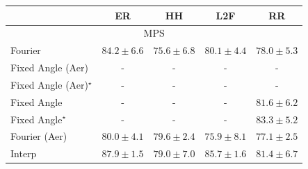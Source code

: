 \begin{tabular}{l|cccc|}
\toprule
            & ER & HH & L2F & RR \\
\midrule
\multicolumn{5}{c}{\rule{0pt}{8pt}MPS} \\
\midrule
Fourier & {\cellcolor[HTML]{DC5E0B}} \color[HTML]{F1F1F1} $84.2\pm 6.6$ & {\cellcolor[HTML]{FED16B}} \color[HTML]{000000} $75.6\pm 6.8$ & {\cellcolor[HTML]{FC9427}} \color[HTML]{000000} $80.1\pm 4.4$ & {\cellcolor[HTML]{FEB340}} \color[HTML]{000000} $78.0\pm 5.3$ \\
Fixed Angle (Aer) & {\cellcolor[HTML]{000000}} \color[HTML]{F1F1F1} {\cellcolor{white}} \color{black} - & {\cellcolor[HTML]{000000}} \color[HTML]{F1F1F1} {\cellcolor{white}} \color{black} - & {\cellcolor[HTML]{000000}} \color[HTML]{F1F1F1} {\cellcolor{white}} \color{black} - & {\cellcolor[HTML]{000000}} \color[HTML]{F1F1F1} {\cellcolor{white}} \color{black} - \\
Fixed Angle (Aer)$^\star$ & {\cellcolor[HTML]{000000}} \color[HTML]{F1F1F1} {\cellcolor{white}} \color{black} - & {\cellcolor[HTML]{000000}} \color[HTML]{F1F1F1} {\cellcolor{white}} \color{black} - & {\cellcolor[HTML]{000000}} \color[HTML]{F1F1F1} {\cellcolor{white}} \color{black} - & {\cellcolor[HTML]{000000}} \color[HTML]{F1F1F1} {\cellcolor{white}} \color{black} - \\
Fixed Angle & {\cellcolor[HTML]{000000}} \color[HTML]{F1F1F1} {\cellcolor{white}} \color{black} - & {\cellcolor[HTML]{000000}} \color[HTML]{F1F1F1} {\cellcolor{white}} \color{black} - & {\cellcolor[HTML]{000000}} \color[HTML]{F1F1F1} {\cellcolor{white}} \color{black} - & {\cellcolor[HTML]{F3801C}} \color[HTML]{F1F1F1} $81.6\pm 6.2$ \\
Fixed Angle$^\star$ & {\cellcolor[HTML]{000000}} \color[HTML]{F1F1F1} {\cellcolor{white}} \color{black} - & {\cellcolor[HTML]{000000}} \color[HTML]{F1F1F1} {\cellcolor{white}} \color{black} - & {\cellcolor[HTML]{000000}} \color[HTML]{F1F1F1} {\cellcolor{white}} \color{black} - & {\cellcolor[HTML]{E66A11}} \color[HTML]{F1F1F1} $83.3\pm 5.2$ \\
Fourier (Aer) & {\cellcolor[HTML]{FD9627}} \color[HTML]{000000} $80.0\pm 4.1$ & {\cellcolor[HTML]{FE9C2C}} \color[HTML]{000000} $79.6\pm 2.4$ & {\cellcolor[HTML]{FECE65}} \color[HTML]{000000} $75.9\pm 8.1$ & {\cellcolor[HTML]{FEC14C}} \color[HTML]{000000} $77.1\pm 2.5$ \\
Interp & {\cellcolor[HTML]{A63A03}} \color[HTML]{F1F1F1} $87.9\pm 1.5$ & {\cellcolor[HTML]{FEA433}} \color[HTML]{000000} $79.0\pm 7.0$ & {\cellcolor[HTML]{CB4B02}} \color[HTML]{F1F1F1} $85.7\pm 1.6$ & {\cellcolor[HTML]{F4821D}} \color[HTML]{F1F1F1} $81.4\pm 6.7$ \\

\end{tabular}
